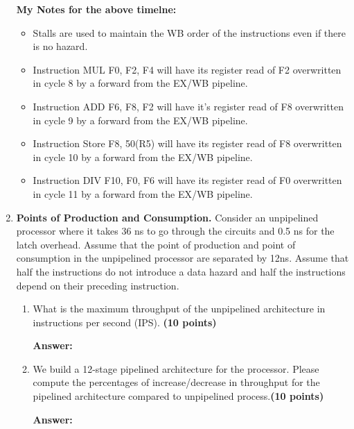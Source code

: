 \documentclass[a4paper, 11pt]{exam}
\begin{document}
\begin{center}
\begin{enumerate}
\begin{enumerate}
\end{enumerate}
\textbf{My Notes for the above timelne:}
%
\begin{itemize}
	\item Stalls are used to maintain the WB order of the instructions even if there is no hazard.
	\item Instruction MUL F0, F2, F4 will have its register read of F2 overwritten in cycle 8 by a forward from the EX/WB pipeline. 
	\item Instruction ADD F6, F8, F2 will have it's register read of F8 overwritten in cycle 9 by a forward from the EX/WB pipeline.
	\item Instruction Store F8, 50(R5) will have its register read of F8 overwritten in cycle 10 by a forward from the EX/WB pipeline.
	\item Instruction DIV F10, F0, F6 will have its register read of F0 overwritten in cycle 11 by a forward from the EX/WB pipeline.

\end{itemize}

\pagebreak

\item \textbf{Points of Production and Consumption.}
Consider an unpipelined processor where it takes 36 ns to go through the circuits and 0.5 ns for the latch overhead. Assume that the point of production and point of consumption in the unpipelined processor are separated by 12ns. Assume that half the instructions do not introduce a data hazard and half the instructions depend on their preceding instruction.

\begin{enumerate}
\item What is the maximum throughput of the unpipelined architecture in instructions per second (IPS). \textbf{(10 points)} \\

\hfill
 
\textbf{Answer:} 

\hfill

\item We build a 12-stage pipelined architecture for the processor. Please compute the percentages of increase/decrease in throughput for the pipelined architecture compared to unpipelined process.\textbf {(10 points)}

\hfill
 
\textbf{Answer:} 

\hfill

\end{enumerate}


\end{enumerate}
\end{center}
\end{document}
